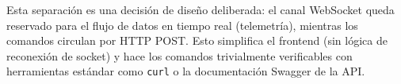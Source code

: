 Esta separación es una decisión de diseño deliberada: el canal WebSocket queda reservado para 
el flujo de datos en tiempo real (telemetría), mientras los comandos circulan por HTTP POST. 
Esto simplifica el frontend (sin lógica de reconexión de socket) y hace los comandos 
trivialmente verificables con herramientas estándar como \texttt{curl} o la documentación 
Swagger de la API.

